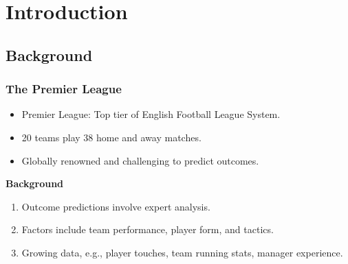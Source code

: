 \documentclass{beamer}
\begin{document}
% 
\begin{frame}
  \titlepage
\end{frame}
% 
% 
\begin{frame}
  \tableofcontents
\end{frame}
% 
% 
% 
% 
% 
% 
\section{Introduction}
\subsection{Background}
\begin{frame}
  \frametitle{The Premier League}
  \begin{itemize}
    \item Premier League: Top tier of English Football League System.
    \item 20 teams play 38 home and away matches.
    \item Globally renowned and challenging to predict outcomes.
  \end{itemize}

  \textbf{Background}

  \begin{enumerate}
    \item Outcome predictions involve expert analysis.
    \item Factors include team performance, player form, and tactics.
    \item Growing data, e.g., player touches, team running stats, manager experience.
  \end{enumerate}
\end{frame}
\end{document}
